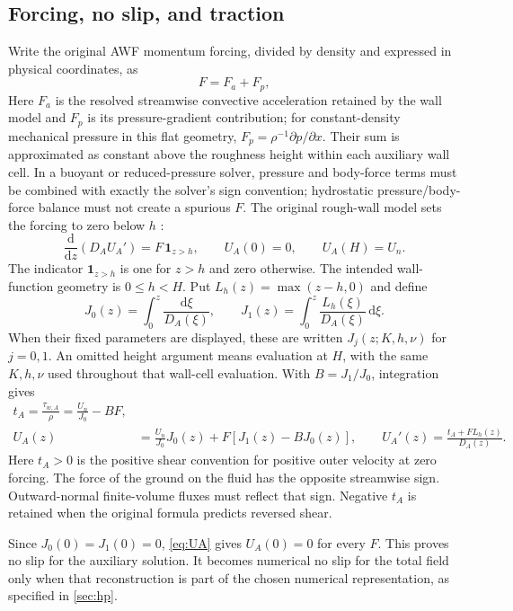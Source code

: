 \documentclass[11pt,a4paper]{article}
\numberwithin{equation}{section}
\newcommand{\dd}{\mathrm{d}}
\begin{document}
\subsection{Forcing, no slip, and traction}
Write the original AWF momentum forcing, divided by density and expressed
in physical coordinates, as
\begin{equation}
 F=F_a+F_p,
 \label{eq:F}
\end{equation}
Here $F_a$ is the resolved streamwise convective acceleration retained
by the wall model and $F_p$ is its pressure-gradient contribution; for
constant-density mechanical pressure in this flat geometry,
$F_p=\rho^{-1}\partial p/\partial x$. Their sum is approximated as
constant above the roughness height within each auxiliary wall cell.
In a buoyant or reduced-pressure solver, pressure and body-force terms must
be combined with exactly the solver's sign convention; hydrostatic
pressure/body-force balance must not create a spurious $F$.
The original rough-wall model sets the forcing to zero below $h$
\cite[Eq.~(26)]{SCI2006}:
\begin{equation}
 \frac{\dd}{\dd z}(D_AU_A')=F\,\mathbf1_{z>h},\qquad
 U_A(0)=0,\qquad U_A(H)=U_n.
 \label{eq:AWFode}
\end{equation}
The indicator $\mathbf1_{z>h}$ is one for $z>h$ and zero otherwise.
The intended wall-function geometry is $0\leq h<H$. Put
$L_h(z)=\max(z-h,0)$ and define
\begin{equation}
 J_0(z)=\int_0^z\frac{\dd\xi}{D_A(\xi)},\qquad
 J_1(z)=\int_0^z\frac{L_h(\xi)}{D_A(\xi)}\,\dd\xi.
 \label{eq:J01}
\end{equation}
When their fixed parameters are displayed, these are written
$J_j(z;K,h,\nu)$ for $j=0,1$. An omitted height argument means evaluation
at $H$, with the same $K,h,\nu$ used throughout that wall-cell evaluation.
With $B=J_1/J_0$, integration gives
\begin{align}
\boxed{t_A=\frac{\tau_{w,A}}{\rho}=\frac{U_n}{J_0}-BF,}
\label{eq:tA}\\
U_A(z)&=\frac{U_n}{J_0}J_0(z)
 +F[J_1(z)-BJ_0(z)],\qquad
U_A'(z)=\frac{t_A+FL_h(z)}{D_A(z)}.
\label{eq:UA}
\end{align}
Here $t_A>0$ is the positive shear convention for positive outer velocity
at zero forcing. The force of the ground on the fluid has the opposite
streamwise sign. Outward-normal finite-volume fluxes must reflect that sign.
Negative $t_A$ is retained when the original formula predicts reversed shear.

Since $J_0(0)=J_1(0)=0$, \cref{eq:UA} gives $U_A(0)=0$ for every $F$.
This proves no slip for the auxiliary solution. It becomes numerical
no slip for the total field only when that reconstruction is part of the
chosen numerical representation, as specified in \cref{sec:hp}.
\end{document}
